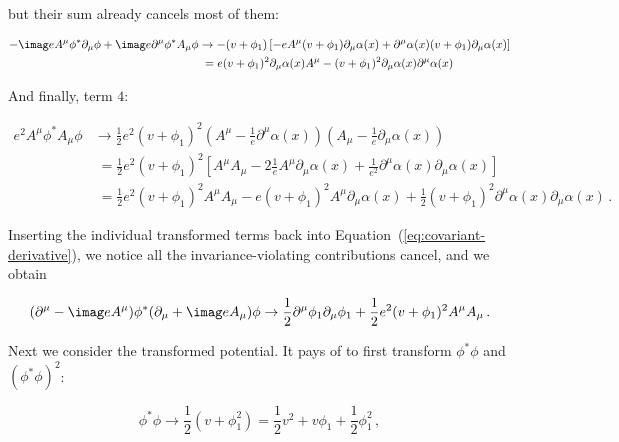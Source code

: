 % 
but their sum already cancels most of them:
% 
\begin{linenomath*}
\begin{equation}
\begin{split}
- \imag e A^\mu \phi^\ast \partial_\mu \phi
+ \imag e \partial^\mu \phi^\ast A_\mu \phi
% 
&\to -(v+\phi_1) \left[
    - e A^\mu (v+\phi_1) \partial_\mu \alpha(x)
    + \partial^\mu \alpha(x) (v+\phi_1) \partial_\mu \alpha(x)
    \right]
    \\
% 
&\;=
    e (v+\phi_1)^2 \partial_\mu \alpha(x) A^\mu
    - (v+\phi_1)^2 \partial_\mu \alpha(x) \partial^\mu \alpha(x)
\end{split}
\end{equation}
\end{linenomath*}
% 
And finally, term $4$:
% 
\begin{linenomath*}
\begin{equation}
\begin{split}
e^2 A^\mu \phi^\ast A_\mu \phi
% 
&\to \frac{1}{2} e^2 (v+\phi_1)^2
    (A^\mu - \frac{1}{e} \partial^\mu \alpha(x) )
    (A_\mu - \frac{1}{e} \partial_\mu \alpha(x) )
    \\
% 
&\;= \frac{1}{2} e^2 (v+\phi_1)^2 \left[
    A^\mu A_\mu
    - 2 \frac{1}{e} A^\mu \partial_\mu \alpha(x)
    + \frac{1}{e^2} \partial^\mu \alpha(x) \partial_\mu \alpha(x)
    \right]
    \\
% 
&\;= 
    \frac{1}{2} e^2 (v+\phi_1)^2 A^\mu A_\mu
    - e (v+\phi_1)^2 A^\mu \partial_\mu \alpha(x)
    + \frac{1}{2} (v+\phi_1)^2 \partial^\mu \alpha(x) \partial_\mu \alpha(x)
\,.
\end{split}
\end{equation}
\end{linenomath*}
% 
Inserting the individual transformed terms back into Equation~(\ref{eq:covariant-derivative}), we notice all the invariance-violating contributions cancel, and we obtain
% 
\begin{linenomath*}
\begin{equation}
(\partial^\mu - \imag e A^\mu) \phi^\ast (\partial_\mu + \imag e A_\mu) \phi
\to
    \frac{1}{2} \partial^\mu \phi_1 \partial_\mu \phi_1
    + \frac{1}{2} e^2 (v+\phi_1)^2 A^\mu A_\mu
\,.
\end{equation}
\end{linenomath*}
% 
Next we consider the transformed potential.
% 
It pays of to first transform $\phi^\ast\phi$ and $(\phi^\ast\phi)^2$:
% 
\begin{linenomath*}
\begin{equation}
\phi^\ast\phi
\to 
\frac{1}{2} (v+\phi_1^2) = \frac{1}{2} v^2 + v\phi_1 + \frac{1}{2} \phi_1^2
\,,
\end{equation}
\end{linenomath*}
